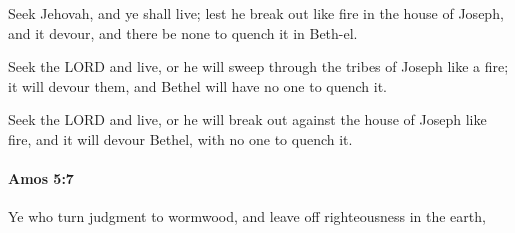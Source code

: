			\begin{versebox}
					\item[BHS] 
					\item[LXX] 
					\item[ASV] Seek Jehovah, and ye shall live; lest he break out like fire in the house of Joseph, and it devour, and there be none to quench it in Beth-el.
					\item[NIV] Seek the LORD and live, or he will sweep through the tribes of Joseph like a fire; it will devour them, and Bethel will have no one to quench it.
					\item[NRSV] Seek the LORD and live, or he will break out against the house of Joseph like fire, and it will devour Bethel, with no one to quench it.
			\end{versebox}

		\paragraph{Amos 5:7} %
			\label{AMOS-5-7}

			Ye who turn judgment to wormwood, and leave off righteousness in the earth,

